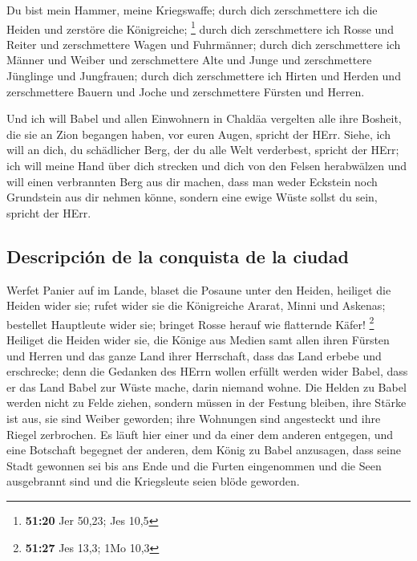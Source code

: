  Du bist mein Hammer, meine Kriegswaffe; durch dich
zerschmettere ich die Heiden und zerstöre die Königreiche; \footnote{\textbf{51:20}
  Jer 50,23; Jes 10,5}  durch dich zerschmettere ich
Rosse und Reiter und zerschmettere Wagen und Fuhrmänner; 
durch dich zerschmettere ich Männer und Weiber und zerschmettere Alte
und Junge und zerschmettere Jünglinge und Jungfrauen; 
durch dich zerschmettere ich Hirten und Herden und zerschmettere Bauern
und Joche und zerschmettere Fürsten und Herren.

 Und ich will Babel und allen Einwohnern in Chaldäa
vergelten alle ihre Bosheit, die sie an Zion begangen haben, vor euren
Augen, spricht der HErr.  Siehe, ich will an dich, du
schädlicher Berg, der du alle Welt verderbest, spricht der HErr; ich
will meine Hand über dich strecken und dich von den Felsen herabwälzen
und will einen verbrannten Berg aus dir machen,  dass man
weder Eckstein noch Grundstein aus dir nehmen könne, sondern eine ewige
Wüste sollst du sein, spricht der HErr.

\hypertarget{descripciuxf3n-de-la-conquista-de-la-ciudad}{%
\subsection{Descripción de la conquista de la
ciudad}\label{descripciuxf3n-de-la-conquista-de-la-ciudad}}

 Werfet Panier auf im Lande, blaset die Posaune unter den
Heiden, heiliget die Heiden wider sie; rufet wider sie die Königreiche
Ararat, Minni und Askenas; bestellet Hauptleute wider sie; bringet Rosse
herauf wie flatternde Käfer! \footnote{\textbf{51:27} Jes 13,3; 1Mo 10,3}
 Heiliget die Heiden wider sie, die Könige aus Medien
samt allen ihren Fürsten und Herren und das ganze Land ihrer Herrschaft,
 dass das Land erbebe und erschrecke; denn die Gedanken
des HErrn wollen erfüllt werden wider Babel, dass er das Land Babel zur
Wüste mache, darin niemand wohne.  Die Helden zu Babel
werden nicht zu Felde ziehen, sondern müssen in der Festung bleiben,
ihre Stärke ist aus, sie sind Weiber geworden; ihre Wohnungen sind
angesteckt und ihre Riegel zerbrochen.  Es läuft hier
einer und da einer dem anderen entgegen, und eine Botschaft begegnet der
anderen, dem König zu Babel anzusagen, dass seine Stadt gewonnen sei bis
ans Ende  und die Furten eingenommen und die Seen
ausgebrannt sind und die Kriegsleute seien blöde geworden.

